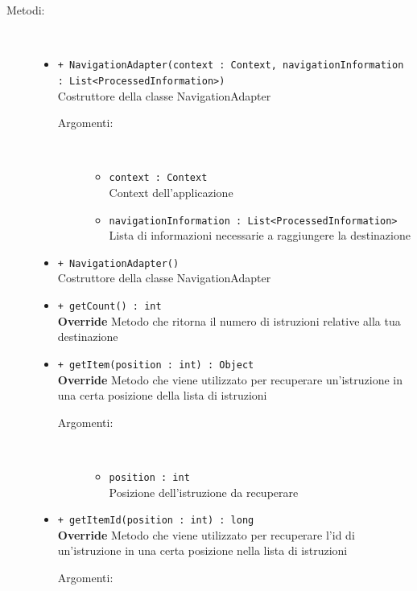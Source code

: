\documentclass[../DefinizioneDiProdotto.tex]{subfiles}
\begin{document}
\begin{description}
\begin{itemize}
	\end{itemize}
	\item[Metodi:] \
	\begin{itemize}
		\item \texttt{+ NavigationAdapter(context : Context, navigationInformation : List<ProcessedInformation>)}\\
		Costruttore della classe NavigationAdapter
		\begin{description}
			\item[Argomenti:] \
			\begin{itemize}
				\item \texttt{context : Context}\\
				Context dell'applicazione\item \texttt{navigationInformation : List<ProcessedInformation>}\\
				Lista di informazioni necessarie a raggiungere la destinazione\end{itemize}
		\end{description}
		\item \texttt{+ NavigationAdapter()}\\
		Costruttore della classe NavigationAdapter
		\item \texttt{+ getCount() : int}\\
		\textbf{Override} Metodo che ritorna il numero di istruzioni relative alla tua destinazione
		\item \texttt{+ getItem(position : int) : Object}\\
		\textbf{Override} Metodo che viene utilizzato per recuperare un'istruzione in una certa posizione della lista di istruzioni
		\begin{description}
			\item[Argomenti:] \
			\begin{itemize}
				\item \texttt{position : int}\\
				Posizione dell'istruzione da recuperare\end{itemize}
		\end{description}
		\item \texttt{+ getItemId(position : int) : long}\\
		\textbf{Override} Metodo che viene utilizzato per recuperare l'id di un'istruzione in una certa posizione nella lista di istruzioni
		\begin{description}
			\item[Argomenti:] \
			\begin{itemize}

\end{itemize}
\end{description}
\end{itemize}
\end{description}
\end{document}
